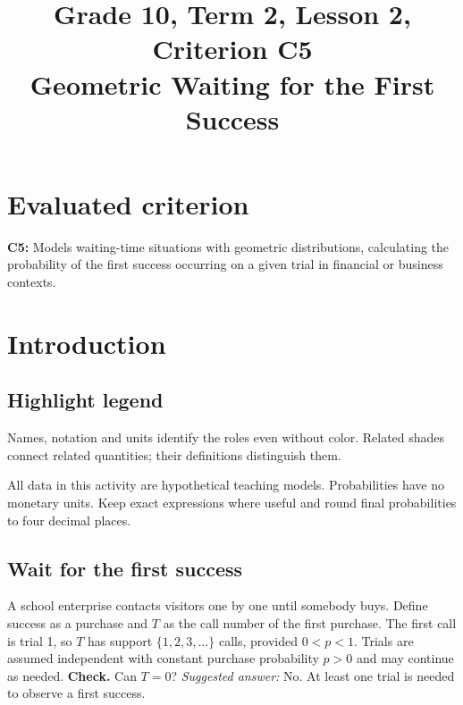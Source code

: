 \makeatletter
{}
\makeatother



\CoordinatedTermTwoPalette
\usepackage{needspace}
\setlength{\emergencystretch}{2em}
\title{Grade 10, Term 2, Lesson 2, Criterion C5\\Geometric Waiting for the First Success}
\author{}
\date{}

\maketitle
\setcounter{tocdepth}{1}
\setcounter{secnumdepth}{2}
\label{toc}
\tableofcontents
\section*{Evaluated criterion}
\textbf{C5:} Models waiting-time situations with geometric distributions, calculating the probability of the first success occurring on a given trial in financial or business contexts.
\section{Introduction}\label{sec:t2-c5-introduction}
\subsection*{Highlight legend}
\label{tab:highlight-legend}
Names, notation and units identify the roles even without color. Related shades connect related quantities; their definitions distinguish them.

All data in this activity are hypothetical teaching models. Probabilities have no monetary units. Keep exact expressions where useful and round final probabilities to four decimal places.
\subsection{Wait for the first success}
A school enterprise contacts visitors one by one until somebody buys. Define success as a purchase and $T$ as the call number of the first purchase. The first call is trial 1, so $T$ has support $\{1,2,3,\ldots\}$ calls, provided $0<p<1$. Trials are assumed independent with constant purchase probability $p>0$ and may continue as needed.
\textbf{Check.} Can $T=0$? \emph{Suggested answer:} No. At least one trial is needed to observe a first success.


